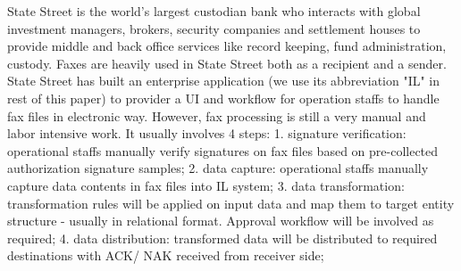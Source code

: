 \documentclass[sigconf]{acmart}
\begin{document}
State Street is the world's largest custodian bank who interacts with global investment managers, brokers, security companies and settlement houses to provide middle and back office services like record keeping, fund administration, custody. Faxes are heavily used in State Street both as a recipient and a sender. State Street has built an enterprise application (we  use its abbreviation "IL" in rest of this paper) to provider a UI and workflow for operation staffs to handle fax files in electronic way. However, fax processing is still a very manual and labor intensive work. It usually involves 4 steps:
1. signature verification: operational staffs manually verify signatures on fax files based on pre-collected authorization signature samples;
2. data capture: operational staffs manually capture data contents in fax files into IL system;
3. data transformation: transformation rules will be applied on input data and map them to target entity structure - usually in relational format. Approval workflow will be involved as required;
4. data distribution: transformed data will be distributed to required destinations with ACK/ NAK received from receiver side;
\end{document}
